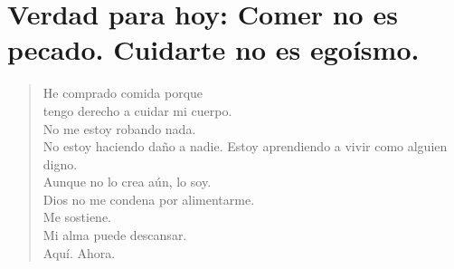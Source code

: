 \documentclass[12pt]{article}
\begin{document}
\section*{Verdad para hoy: Comer no es pecado. Cuidarte no es egoísmo.}

\begin{verse}
He comprado comida porque \\
tengo derecho a cuidar mi cuerpo.\\
No me estoy robando nada. \\No estoy haciendo daño a nadie.
Estoy aprendiendo a vivir como alguien digno.\\ Aunque no lo crea aún, lo soy.\\
Dios no me condena por alimentarme. \\Me sostiene.\\
Mi alma puede descansar.\\ Aquí. Ahora.
\end{verse}
\end{document}
